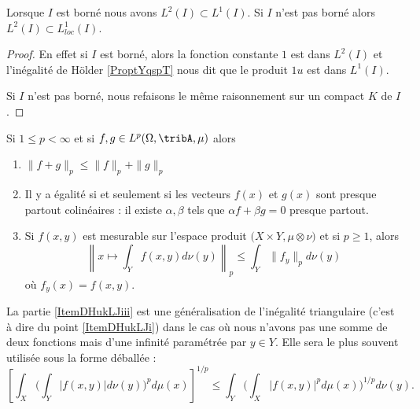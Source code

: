 \begin{lemma}   \label{LemTLHwYzD}
    Lorsque \( I\) est borné nous avons \( L^2(I)\subset L^1(I)\). Si \( I\) n'est pas borné alors \( L^2(I)\subset L^1_{loc}(I)\).
\end{lemma}

\begin{proof}
    En effet si \( I\) est borné, alors la fonction constante \( 1\) est dans \( L^2(I)\) et l'inégalité de Hölder \ref{ProptYqspT} nous dit que le produit \( 1u\) est dans \( L^1(I)\).

    Si \( I\) n'est pas borné, nous refaisons le même raisonnement sur un compact \( K\) de \( I\).
\end{proof}

\begin{proposition}     \label{PropInegMinkKUpRHg}
    Si \( 1\leq p<\infty\) et si \( f,g\in L^p(\Omega,\tribA,\mu)\) alors
    \begin{enumerate}
        \item   \label{ItemDHukLJi}
            \( \| f+g \|_p\leq \| f \|_p+\| g \|_p\)
        \item
            Il y a égalité si et seulement si les vecteurs \( f(x)\) et \( g(x)\) sont presque partout colinéaires : il existe \( \alpha,\beta\) tels que \( \alpha f+\beta g=0\) presque partout.

        \item   \label{ItemDHukLJiii}

            Si \( f(x,y)\) est mesurable sur l'espace produit \( \big( X\times Y,\mu\otimes\nu \big)\) et si \( p\geq 1\), alors
            \begin{equation}
                \left\|   x\mapsto\int_Y f(x,y)d\nu(y)   \right\|_p\leq
                \int_Y  \| f_y \|_pd\nu(y)
            \end{equation}
            où \( f_y(x)=f(x,y)\).

    \end{enumerate}
\end{proposition}

La partie \ref{ItemDHukLJiii} est une généralisation de l'inégalité triangulaire (c'est à dire du point \ref{ItemDHukLJi}) dans le cas où nous n'avons pas une somme de deux fonctions mais d'une infinité paramétrée par \( y\in Y\). Elle sera le plus souvent utilisée sous la forme déballée :
\begin{equation}    \label{EqZSiTZrH}
    \left[ \int_X\Big( \int_Y| f(x,y) |d\nu(y) \Big)^pd\mu(x) \right]^{1/p}\leq \int_Y\Big( \int_X| f(x,y) |^pd\mu(x) \Big)^{1/p}d\nu(y).
\end{equation}


